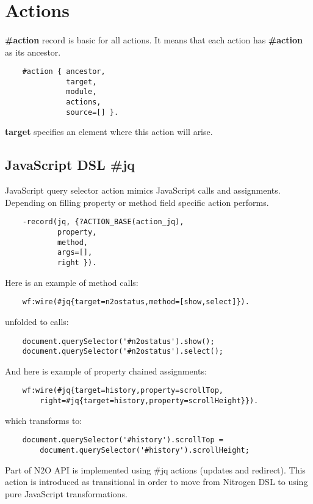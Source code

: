 \section{Actions}

\paragraph{}
{\bf \#action} record is basic for all actions. It means that each action
has {\bf \#action} as its ancestor.

\vspace{1\baselineskip}
\begin{lstlisting}
    #action { ancestor,
              target,
              module,
              actions,
              source=[] }.
\end{lstlisting}
\vspace{1\baselineskip}

{\bf target} specifies an element where this action will arise.

\subsection{JavaScript DSL {\bf \#jq}}
JavaScript query selector action mimics JavaScript calls and assignments.
Depending on filling property or method field specific action performs.

\vspace{1\baselineskip}
\begin{lstlisting}
    -record(jq, {?ACTION_BASE(action_jq),
            property,
            method,
            args=[],
            right }).
\end{lstlisting}
\vspace{1\baselineskip}

Here is an example of method calls:
\begin{lstlisting}
    wf:wire(#jq{target=n2ostatus,method=[show,select]}).
\end{lstlisting}
unfolded to calls:
\begin{lstlisting}
    document.querySelector('#n2ostatus').show();
    document.querySelector('#n2ostatus').select();
\end{lstlisting}
\vspace{1\baselineskip}

And here is example of property chained assignments:
\begin{lstlisting}
    wf:wire(#jq{target=history,property=scrollTop,
        right=#jq{target=history,property=scrollHeight}}).
\end{lstlisting}
which transforms to:
\begin{lstlisting}
    document.querySelector('#history').scrollTop =
        document.querySelector('#history').scrollHeight;
\end{lstlisting}
\vspace{1\baselineskip}
Part of N2O API is implemented using \#jq actions (updates and redirect).
This action is introduced as transitional in order to move
from Nitrogen DSL to using pure JavaScript transformations.


